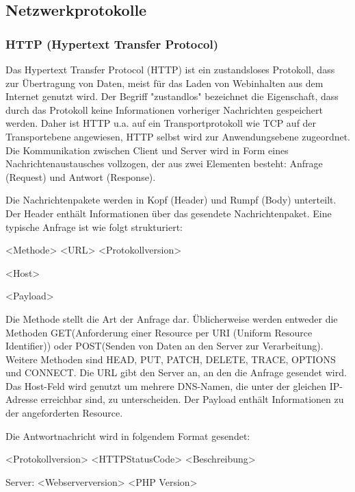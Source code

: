 
\subsection{Netzwerkprotokolle}

\subsubsection{HTTP (Hypertext Transfer Protocol)}
Das Hypertext Transfer Protocol (HTTP) ist ein zustandsloses Protokoll, dass zur Übertragung von Daten, meist für das Laden von Webinhalten aus dem Internet genutzt wird. Der Begriff "zustandlos" bezeichnet die Eigenschaft, dass durch das Protokoll keine Informationen vorheriger Nachrichten gespeichert werden. Daher ist HTTP u.a. auf ein Transportprotokoll wie TCP auf der Transportebene angewiesen, HTTP selbst wird zur Anwendungsebene zugeordnet. Die Kommunikation zwischen Client und Server wird in Form eines Nachrichtenaustausches vollzogen, der aus zwei Elementen besteht: Anfrage (Request) und Antwort (Response). 


Die Nachrichtenpakete werden in Kopf (Header) und Rumpf (Body) unterteilt. Der Header enthält Informationen über das gesendete Nachrichtenpaket. Eine typische Anfrage ist wie folgt strukturiert:

<Methode> <URL> <Protokollversion>

<Host>

<Payload>


Die Methode stellt die Art der Anfrage dar. Üblicherweise werden entweder die Methoden \glqq GET\grqq  (Anforderung einer Resource per URI (Uniform Resource Identifier)) oder \glqq POST\grqq  (Senden von Daten an den Server zur Verarbeitung). Weitere Methoden sind HEAD, PUT, PATCH, DELETE, TRACE, OPTIONS und CONNECT.
Die URL gibt den Server an, an den die Anfrage gesendet wird. Das Host-Feld wird genutzt um mehrere DNS-Namen, die unter der gleichen IP-Adresse erreichbar sind, zu unterscheiden. Der Payload enthält Informationen zu der angeforderten Resource.

Die Antwortnachricht wird in folgendem Format gesendet:

<Protokollversion> <HTTPStatusCode> <Beschreibung>

Server: <Webserverversion> <PHP Version>

